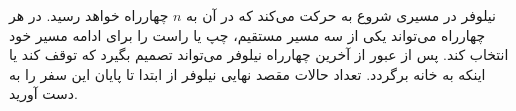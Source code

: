 \p
    نیلوفر در مسیری شروع به حرکت می‌کند که در آن به
    $n$
    چهارراه خواهد رسید.
    در هر چهارراه می‌تواند یکی از سه مسیر مستقیم، چپ یا راست را برای ادامه مسیر خود انتخاب کند. پس از عبور از آخرین چهارراه نیلوفر می‌تواند تصمیم بگیرد که توقف کند یا اینکه به خانه برگردد. تعداد حالات مقصد نهایی نیلوفر از ابتدا تا پایان این سفر را به دست آورید.
    

